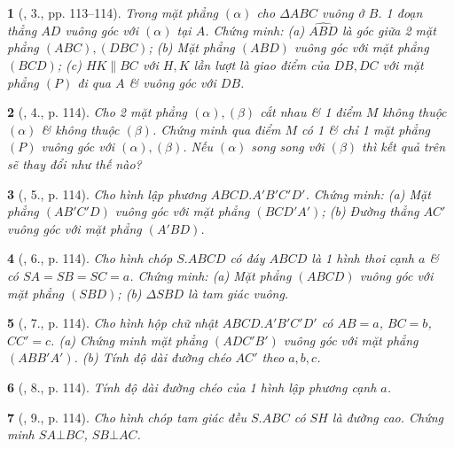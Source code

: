 \documentclass{article}
\newtheorem{baitoan}{}
\begin{document}
\begin{baitoan}[\cite{SGK_Toan_11_hinh_hoc_co_ban}, 3., pp. 113--114]
	Trong mặt phẳng $(\alpha)$ cho $\Delta ABC$ vuông ở $B$. 1 đoạn thẳng $AD$ vuông góc với $(\alpha)$ tại $A$. Chứng minh: (a) $\widehat{ABD}$ là góc giữa 2 mặt phẳng $(ABC),(DBC)$; (b) Mặt phẳng $(ABD)$ vuông góc với mặt phẳng $(BCD)$; (c) $HK\parallel BC$ với $H,K$ lần lượt là giao điểm của $DB,DC$ với mặt phẳng $(P)$ đi qua $A$ \& vuông góc với $DB$.
\end{baitoan}

\begin{baitoan}[\cite{SGK_Toan_11_hinh_hoc_co_ban}, 4., p. 114]
	Cho 2 mặt phẳng $(\alpha),(\beta)$ cắt nhau \& 1 điểm $M$ không thuộc $(\alpha)$ \& không thuộc $(\beta)$. Chứng minh qua điểm $M$ có 1 \& chỉ 1 mặt phẳng $(P)$ vuông góc với $(\alpha),(\beta)$. Nếu $(\alpha)$ song song với $(\beta)$ thì kết quả trên sẽ thay đổi như thế nào?
\end{baitoan}

\begin{baitoan}[\cite{SGK_Toan_11_hinh_hoc_co_ban}, 5., p. 114]
	Cho hình lập phương $ABCD.A'B'C'D'$. Chứng minh: (a) Mặt phẳng $(AB'C'D)$ vuông góc với mặt phẳng $(BCD'A')$; (b) Đường thẳng $AC'$ vuông góc với mặt phẳng $(A'BD)$.
\end{baitoan}

\begin{baitoan}[\cite{SGK_Toan_11_hinh_hoc_co_ban}, 6., p. 114]
	Cho hình chóp $S.ABCD$ có đáy $ABCD$ là 1 hình thoi cạnh $a$ \& có $SA = SB = SC = a$. Chứng minh: (a) Mặt phẳng $(ABCD)$ vuông góc với mặt phẳng $(SBD)$; (b) $\Delta SBD$ là tam giác vuông.
\end{baitoan}

\begin{baitoan}[\cite{SGK_Toan_11_hinh_hoc_co_ban}, 7., p. 114]
	Cho hình hộp chữ nhật $ABCD.A'B'C'D'$ có $AB = a$, $BC = b$, $CC' = c$. (a) Chứng minh mặt phẳng $(ADC'B')$ vuông góc với mặt phẳng $(ABB'A')$. (b) Tính độ dài đường chéo $AC'$ theo $a,b,c$.
\end{baitoan}

\begin{baitoan}[\cite{SGK_Toan_11_hinh_hoc_co_ban}, 8., p. 114]
	Tính độ dài đường chéo của 1 hình lập phương cạnh $a$.
\end{baitoan}

\begin{baitoan}[\cite{SGK_Toan_11_hinh_hoc_co_ban}, 9., p. 114]
	Cho hình chóp tam giác đều $S.ABC$ có $SH$ là đường cao. Chứng minh $SA\bot BC$, $SB\bot AC$.
\end{baitoan}
\end{document}
